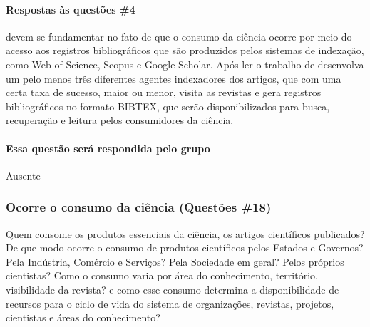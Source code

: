 \paragraph{Respostas às questões \#4} devem se fundamentar no fato de que o consumo da ciência ocorre por meio do acesso aos registros bibliográficos que são produzidos pelos sistemas de indexação, como Web of Science, Scopus e Google Scholar. Após ler o trabalho de \cite{gusenbauer_google_2019} desenvolva um pelo menos três diferentes agentes indexadores dos artigos, que com uma certa taxa de sucesso, maior ou menor, visita as revistas e gera registros bibliográficos no formato BIBTEX, que serão disponibilizados para busca, recuperação e leitura pelos consumidores da ciência.

\paragraph{Essa questão será respondida pelo grupo}
Ausente

\subsubsection{Ocorre o consumo da ciência (Questões \#18)}
Quem consome os produtos essenciais da ciência, os artigos científicos publicados? De que modo ocorre o consumo de produtos científicos pelos Estados e Governos? Pela Indústria, Comércio e Serviços? Pela Sociedade em geral? Pelos próprios cientistas? Como o consumo varia por área do conhecimento, território, visibilidade da revista? e como esse consumo determina a disponibilidade de recursos para o ciclo de vida do sistema de organizações, revistas, projetos, cientistas e áreas do conhecimento? 

